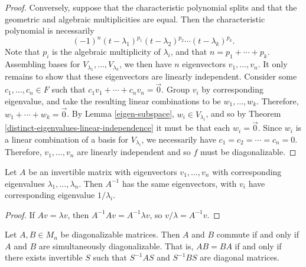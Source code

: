 \begin{proof}
    Conversely, suppose that the characteristic polynomial splits and that the geometric and algebraic multiplicities are equal. Then the characteristic polynomial is necessarily
    \[(-1)^n(t-\lambda_1)^{p_1}(t-\lambda_2)^{p_2}\cdots(t-\lambda_k)^{p_k}.\]
    Note that $p_i$ is the algebraic multiplicity of $\lambda_i$, and that $n = p_1 + \cdots + p_k$. Assembling bases for $V_{\lambda_1}, \ldots, V_{\lambda_k}$, we then have $n$ eigenvectors $v_1, \ldots, v_n$. It only remains to show that these eigenvectors are linearly independent. Consider some $c_1, \ldots, c_n \in F$ such that $c_1v_1 + \cdots + c_nv_n = \vec{0}$. Group $v_i$ by corresponding eigenvalue, and take the resulting linear combinations to be $w_1, \ldots, w_k$. Therefore, $w_1 + \cdots + w_k = \vec{0}$. By Lemma \ref{eigen-subspace}, $w_i \in V_{\lambda_i}$, and so by Theorem \ref{distinct-eigenvalues-linear-independence} it must be that each $w_i = \vec{0}$. Since $w_i$ is a linear combination of a basis for $V_{\lambda_i}$, we necessarily have $c_1 = c_2 = \cdots = c_n = 0$. Therefore, $v_1, \ldots, v_n$ are linearly independent and so $f$ must be diagonalizable.
\end{proof}

\begin{thm}
    Let $A$ be an invertible matrix with eigenvectors $v_1, \ldots, v_n$ with corresponding eigenvalues $\lambda_1, \ldots, \lambda_n$. Then $A^{-1}$ has the same eigenvectors, with $v_i$ have corresponding eigenvalue $1/\lambda_i$.
\end{thm}

\begin{proof}
    If $Av = \lambda v$, then $A^{-1}Av = A^{-1}\lambda v$, so $v/\lambda = A^{-1}v$.
\end{proof}

\begin{thm}
    Let $A, B \in M_{n}$ be diagonalizable matrices. Then $A$ and $B$ commute if and only if $A$ and $B$ are simultaneously diagonalizable. That is, $AB = BA$ if and only if there exists invertible $S$ such that $S^{-1}AS$ and $S^{-1}BS$ are diagonal matrices.
\end{thm}

